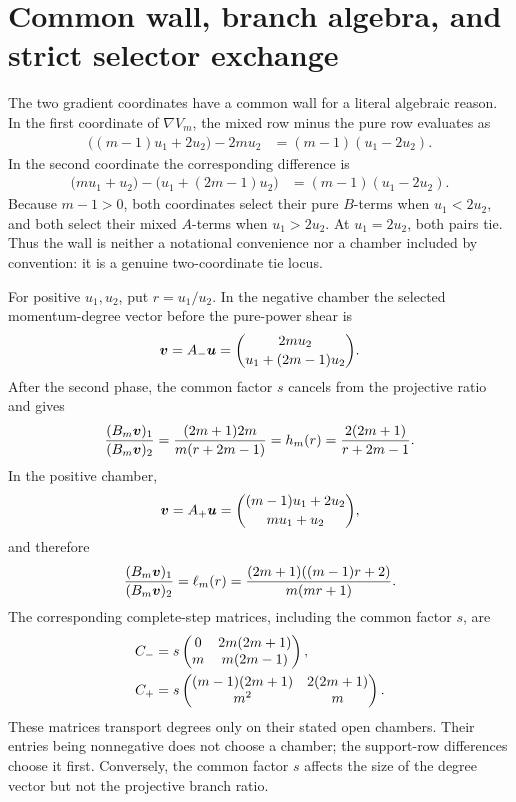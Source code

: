 \documentclass[11pt]{article}
\theoremstyle{definition}
\theoremstyle{remark}
\begin{document}
\section{Common wall, branch algebra, and strict selector exchange}
\label{sec:selector}

The two gradient coordinates have a common wall for a literal algebraic
reason.  In the first coordinate of \(\nabla V_m\), the mixed row minus the
pure row evaluates as
\begin{align*}
\bigl((m-1)u_1+2u_2\bigr)-2mu_2
  &=(m-1)(u_1-2u_2).
\end{align*}
In the second coordinate the corresponding difference is
\begin{align*}
\bigl(mu_1+u_2\bigr)-\bigl(u_1+(2m-1)u_2\bigr)
  &=(m-1)(u_1-2u_2).
\end{align*}
Because \(m-1>0\), both coordinates select their pure \(B\)-terms when
\(u_1<2u_2\), and both select their mixed \(A\)-terms when
\(u_1>2u_2\).  At \(u_1=2u_2\), both pairs tie.  Thus the wall is neither a
notational convenience nor a chamber included by convention: it is a genuine
two-coordinate tie locus.

For positive \(u_1,u_2\), put \(r=u_1/u_2\).  In the negative chamber the
selected momentum-degree vector before the pure-power shear is
\begin{equation}
\boldsymbol{v}=A_{-}\boldsymbol{u}
=\binom{2mu_2}{u_1+(2m-1)u_2}.
\label{eq:minus-selected-v}
\end{equation}
After the second phase, the common factor \(s\) cancels from the projective
ratio and gives
\begin{equation}
\frac{(B_m\boldsymbol{v})_1}{(B_m\boldsymbol{v})_2}
=\frac{(2m+1)2m}{m(r+2m-1)}
=h_m(r)=\frac{2(2m+1)}{r+2m-1}.
\label{eq:h-branch}
\end{equation}
In the positive chamber,
\begin{equation}
\boldsymbol{v}=A_{+}\boldsymbol{u}
=\binom{(m-1)u_1+2u_2}{mu_1+u_2},
\label{eq:plus-selected-v}
\end{equation}
and therefore
\begin{equation}
\frac{(B_m\boldsymbol{v})_1}{(B_m\boldsymbol{v})_2}
=\ell_m(r)
=\frac{(2m+1)((m-1)r+2)}{m(mr+1)}.
\label{eq:ell-branch}
\end{equation}
The corresponding complete-step matrices, including the common factor
\(s\), are
\begin{align}
C_{-}
&=s\begin{pmatrix}
0&2m(2m+1)\\
m&m(2m-1)
\end{pmatrix},
\label{eq:c-minus-expanded}\\
C_{+}
&=s\begin{pmatrix}
(m-1)(2m+1)&2(2m+1)\\
m^2&m
\end{pmatrix}.
\label{eq:c-plus-expanded}
\end{align}
These matrices transport degrees only on their stated open chambers.  Their
entries being nonnegative does not choose a chamber; the support-row
differences choose it first.  Conversely, the common factor \(s\) affects
the size of the degree vector but not the projective branch ratio.
\end{document}
